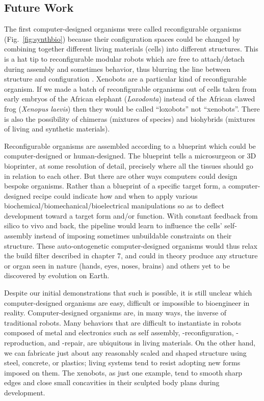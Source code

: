 \subsection{Future Work}


The first computer-designed organisms were called reconfigurable organisms (Fig.~\ref{fig:synthbio}) because their configuration spaces could be changed by combining together different living materials (cells) into different structures.
This is a hat tip to reconfigurable modular robots which are free to attach/detach during assembly and sometimes behavior, thus blurring the line between structure and configuration  \cite{pathak2019learning}.
Xenobots are a particular kind of reconfigurable organism.
If we made a batch of reconfigurable organisms out of cells taken from early embryos of the
African elephant (\textit{Loxodonta})
instead of the African clawed frog (\textit{Xenopus laevis})
then they would be called ``loxobots'' not ``xenobots''.
There is also the possibility of chimeras (mixtures of species) and biohybrids (mixtures of living and synthetic materials).


Reconfigurable organisms are assembled according to a blueprint which could be computer-designed or human-designed.
The blueprint tells a microsurgeon or 3D bioprinter, at some resolution of detail, precisely where all the tissues should go in relation to each other.
But there are other ways computers could design bespoke organisms.
Rather than a blueprint of a specific target form, 
a computer-designed recipe could indicate how and when to apply various biochemical/biomechanical/bioelectrical manipulations so as to deflect development toward a target form and/or function.
With constant feedback from silico to vivo and back,
the pipeline would learn to influence the cells' self-assembly instead of imposing sometimes unbuildable constraints on their structure.
These auto-ontogenetic computer-designed organisms would thus relax the build filter described in chapter 7, and could in theory produce any structure or organ seen in nature (hands, eyes, noses, brains) and others yet to be discovered by evolution on Earth.


Despite our initial demonstrations that such is possible, 
it is still unclear which computer-designed organisms are easy, difficult or impossible to bioengineer in reality.
Computer-designed organisms are, in many ways, the inverse of traditional robots.
Many behaviors that are difficult to instantiate in robots composed of metal and electronics such as self assembly, -reconfiguration, -reproduction, and -repair, are ubiquitous in living materials.
On the other hand, we can fabricate just about any reasonably scaled and shaped structure using steel, concrete, or plastics; living systems tend to resist adopting new forms imposed on them.
The xenobots, as just one example, tend to smooth sharp edges and close small concavities in their sculpted body plans during development.

